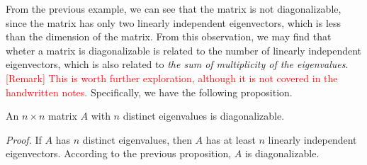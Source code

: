 \documentclass[10pt, a4paper]{article}
\begin{document}
\indent From the previous example, we can see that the matrix is not diagonalizable, since the matrix has only two linearly independent eigenvectors, which is less than the dimension of the matrix.
From this observation, we may find that wheter a matrix is diagonalizable is related to the number of linearly independent eigenvectors, which is also related to \textit{the sum of multiplicity of the eigenvalues}.
\textcolor{red}{[Remark] This is worth further exploration, although it is not covered in the handwritten notes.}
Specifically, we have the following proposition.
\begin{proposition}
    An $n\times n$ matrix $A$ with $n$ distinct eigenvalues is diagonalizable.
\end{proposition}
\indent \textit{Proof.} If $A$ has $n$ distinct eigenvalues, then $A$ has at least $n$ linearly independent eigenvectors. According to the previous proposition, $A$ is diagonalizable.
\end{document}

